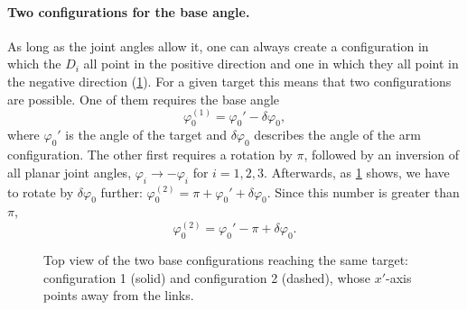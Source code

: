 \paragraph{Two configurations for the base angle.}
As long as the joint angles allow it, one can always create a
configuration in which the $D_i$ all point in the positive direction and
one in which they all point in the negative direction
(\cref{fig:4r-base-configs}). For a given target this means that two
configurations are possible. One of them requires the base angle
\begin{equation}
  \boxed{\varphi_0^{(1)} = \varphi_0' - \delta\varphi_0} ,
  \label{eq:4r-phi0-1}
\end{equation}
where $\varphi_0'$ is the angle of the target and $\delta\varphi_0$
describes the angle of the arm configuration. The other first requires a
rotation by $\pi$, followed by an inversion of all planar joint angles,
$\varphi_i \to -\varphi_i$ for $i = 1, 2, 3$. Afterwards, as \cref{fig:4r-base-configs} shows, we have to rotate by
$\delta\varphi_0$ further: $\varphi_0^{(2)} = \pi + \varphi_0' +
\delta\varphi_0$. Since this number is greater than $\pi$,
\begin{equation}
  \boxed{\varphi_0^{(2)} = \varphi_0' - \pi + \delta\varphi_0} .
  \label{eq:4r-phi0-2}
\end{equation}

\begin{figure}[tbp]
  \centering
  \caption{Top view of the two base configurations reaching the same
    target: configuration 1 (solid) and configuration 2 (dashed), whose
    $x'$-axis points away from the links.}
  \label{fig:4r-base-configs}
\end{figure}

